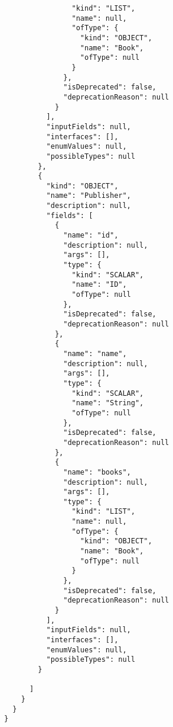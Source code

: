 \begin{lstlisting}
                "kind": "LIST",
                "name": null,
                "ofType": {
                  "kind": "OBJECT",
                  "name": "Book",
                  "ofType": null
                }
              },
              "isDeprecated": false,
              "deprecationReason": null
            }
          ],
          "inputFields": null,
          "interfaces": [],
          "enumValues": null,
          "possibleTypes": null
        },
        {
          "kind": "OBJECT",
          "name": "Publisher",
          "description": null,
          "fields": [
            {
              "name": "id",
              "description": null,
              "args": [],
              "type": {
                "kind": "SCALAR",
                "name": "ID",
                "ofType": null
              },
              "isDeprecated": false,
              "deprecationReason": null
            },
            {
              "name": "name",
              "description": null,
              "args": [],
              "type": {
                "kind": "SCALAR",
                "name": "String",
                "ofType": null
              },
              "isDeprecated": false,
              "deprecationReason": null
            },
            {
              "name": "books",
              "description": null,
              "args": [],
              "type": {
                "kind": "LIST",
                "name": null,
                "ofType": {
                  "kind": "OBJECT",
                  "name": "Book",
                  "ofType": null
                }
              },
              "isDeprecated": false,
              "deprecationReason": null
            }
          ],
          "inputFields": null,
          "interfaces": [],
          "enumValues": null,
          "possibleTypes": null
        }

      ]
    }
  }
}
\end{lstlisting}


